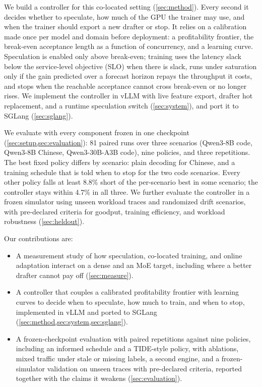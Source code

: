 \documentclass{article}
\begin{document}
We build a controller for this co-located setting (\cref{sec:method}). Every second it decides whether to speculate, how much of the GPU the trainer may use, and when the trainer should export a new drafter or stop. It relies on a calibration made once per model and domain before deployment: a profitability frontier, the break-even acceptance length as a function of concurrency, and a learning curve. Speculation is enabled only above break-even; training uses the latency slack below the service-level objective (SLO) when there is slack, runs under saturation only if the gain predicted over a forecast horizon repays the throughput it costs, and stops when the reachable acceptance cannot cross break-even or no longer rises. We implement the controller in vLLM \citep{kwon2023vllm} with live feature export, drafter hot replacement, and a runtime speculation switch (\cref{sec:system}), and port it to SGLang (\cref{sec:sglang}).

We evaluate with every component frozen in one checkpoint (\cref{sec:setup,sec:evaluation}): 81 paired runs over three scenarios (Qwen3-8B code, Qwen3-8B Chinese, Qwen3-30B-A3B code), nine policies, and three repetitions. The best fixed policy differs by scenario: plain decoding for Chinese, and a training schedule that is told when to stop for the two code scenarios. Every other policy falls at least 8.8\% short of the per-scenario best in some scenario; the controller stays within 4.7\% in all three. 
We further evaluate the controller in a frozen simulator using unseen workload traces and randomized drift scenarios, with pre-declared criteria for goodput, training efficiency, and workload robustness (\cref{sec:heldout}).

Our contributions are:
\begin{itemize}
\item A measurement study of how speculation, co-located training, and online adaptation interact on a dense and an MoE target, including where a better drafter cannot pay off (\cref{sec:measure}).
\item A controller that couples a calibrated profitability frontier with learning curves to decide when to speculate, how much to train, and when to stop, implemented in vLLM and ported to SGLang (\cref{sec:method,sec:system,sec:sglang}).
\item A frozen-checkpoint evaluation with paired repetitions against nine policies, including an informed schedule and a TIDE-style policy, with ablations, mixed traffic under stale or missing labels, a second engine, and a frozen-simulator validation on unseen traces with pre-declared criteria, reported together with the claims it weakens (\cref{sec:evaluation}).
\end{itemize}
\end{document}
